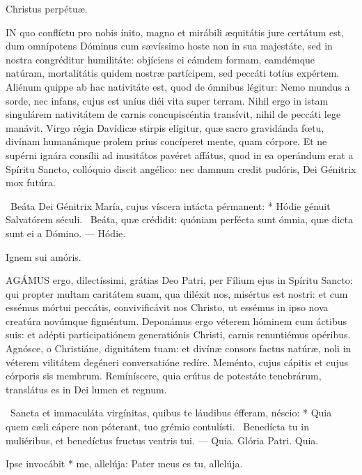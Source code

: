  Christus perpétuæ.


\lettrine[lines=2]{I}{N} quo conflíctu pro nobis ínito, magno et mirábili æquitátis jure certátum est, dum omnípotens Dóminus cum sævíssimo hoste non in sua majestáte, sed in nostra congréditur humilitáte: objíciens ei eámdem formam, eamdémque natúram, mortalitátis quidem nostræ partícipem, sed peccáti totíus expértem. Aliénum quippe ab hac nativitáte est, quod de ómnibus légitur: Nemo mundus a sorde, nec infans, cujus est uníus diéi vita super terram. Nihil ergo in istam singulárem nativitátem de carnis concupiscéntia transívit, nihil de peccáti lege manávit. Virgo régia Davídicæ stirpis elígitur, quæ sacro gravidánda fœtu, divínam humanámque prolem prius concíperet mente, quam córpore. Et ne supérni ignára consílii ad inusitátos pavéret affátus, quod in ea operándum erat a Spíritu Sancto, collóquio discit angélico: nec damnum credit pudóris, Dei Génitrix mox futúra.

\R\ Beáta Dei Génitrix María, cujus víscera intácta pérmanent: * Hódie génuit Salvatórem séculi. \V\ Beáta, quæ crédidit: quóniam perfécta sunt ómnia, quæ dicta sunt ei a Dómino. --- Hódie.

 Ignem sui amóris.


\lettrine[lines=2]{A}{GÁMUS} ergo, dilectíssimi, grátias Deo Patri, per Fílium ejus in Spíritu Sancto: qui propter multam caritátem suam, qua diléxit nos, misértus est nostri: et cum essémus mórtui peccátis, convivificávit nos Christo, ut essémus in ipso nova creatúra novúmque figméntum. Deponámus ergo véterem hóminem cum áctibus suis: et adépti participatiónem generatiónis Christi, carnis renuntiémus opéribus. Agnósce, o Christiáne, dignitátem tuam: et divínæ consors factus natúræ, noli in véterem vilitátem degéneri conversatióne redíre. Meménto, cujus cápitis et cujus córporis sis membrum. Remíníscere, quia erútus de potestáte tenebrárum, translátus es in Dei lumen et regnum.

\R\ Sancta et immaculáta virgínitas, quibus te láudibus éfferam, néscio: * Quia quem cæli cápere non póterant, tuo grémio contulísti. \V\ Benedícta tu in muliéribus, et benedíctus fructus ventris tui. --- Quia. Glória Patri. Quia.


 Ipse invocábit * me, allelúja: Pater meus es tu, allelúja.

